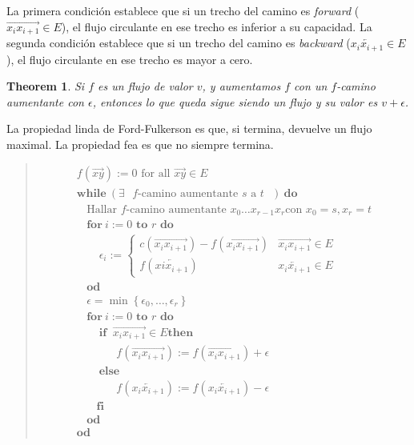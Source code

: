 \documentclass[a4paper]{article}
\newtheorem{theorem}{Theorem}
\newtheorem{theorem}{Theorem}
\begin{document}
La primera condición establece que si un trecho del camino es \textit{forward}
($\overrightarrow{x_i x_{i+1}} \in E$), el flujo circulante en ese trecho es inferior
a su capacidad. La segunda condición establece que si un trecho del camino es
\textit{backward} ($\overleftarrow{x_{i}x_{i+1}} \in E$), el flujo circulante en
ese trecho es mayor a cero. 

\begin{theorem}
    Si $f$ es un flujo de valor $v$, y aumentamos $f$ con un $f$-camino
    aumentante con $\epsilon$, entonces lo que queda sigue siendo un flujo y su
    valor es $v + \epsilon$.
\end{theorem}

La propiedad linda de Ford-Fulkerson es que, si termina, devuelve un flujo
maximal. La propiedad fea es que no siempre termina.

\begin{quote}
\begin{align*}
    &f(\overrightarrow{xy}) := 0 \text{ for all $\overrightarrow{xy} \in E$ } \\ 
    &\textbf{while} ~ (\exists \text{ $f$-camino aumentante $s$ a $t$ })
    ~\textbf{do}\\
    & ~ ~ ~ ~\text{Hallar $f$-camino aumentante $x_0 \ldots x_{r-1}x_r$
    con $x_0 = s, x_{r} = t$}\\
    &~ ~ ~ ~ \textbf{for} ~ i := 0 \textbf{ to } r  \textbf{ do}\\ 
    &~ ~ ~ ~ ~ ~ ~ ~ ~ \epsilon_i := \begin{cases}
        c(\overrightarrow{x_ix_{i+1}}) - f(\overrightarrow{x_ix_{i+1}}) &
        \overrightarrow{x_ix_{i+1}}\in E\\ 
        f(\overleftarrow{x{i}x_{i+1}}) & \overleftarrow{x_{i}x_{i+1}} \in E
    \end{cases} &  \\
    &~ ~ ~ ~ \textbf{od}\\
    &~ ~ ~ ~  \epsilon = \min \left\{ \epsilon_0, \ldots, \epsilon_{r} \right\} \\
    &~ ~ ~ ~ \textbf{for} ~ i := 0 \textbf{ to } r  \textbf{ do}\\ 
    &~ ~ ~ ~ ~ ~ ~ ~ ~ \textbf{if } ~ \overrightarrow{x_ix_{i+1}} \in E \textbf{
    then}\\ 
    & ~ ~ ~ ~ ~ ~ ~ ~ ~ ~ ~ ~ ~ ~ ~ ~ f(\overrightarrow{x_{i}x_{i+1}}) :=
    f(\overrightarrow{x_{i}x_{i+1}}) + \epsilon\\
    & ~ ~ ~ ~ ~ ~ ~ ~ ~  \textbf{else} \\ 
    & ~ ~ ~ ~ ~ ~ ~ ~ ~ ~ ~ ~ ~ ~ ~ ~ f(\overleftarrow{x_{i}x_{i+1}}) :=
    f(\overleftarrow{x_{i}x_{i+1}}) - \epsilon\\
    & ~ ~ ~ ~ ~ ~ ~ ~  \textbf{fi}\\
    & ~ ~ ~ ~ \textbf{od}\\
    &\textbf{od}
\end{align*}

\end{quote}
\normalsize
\end{document}
